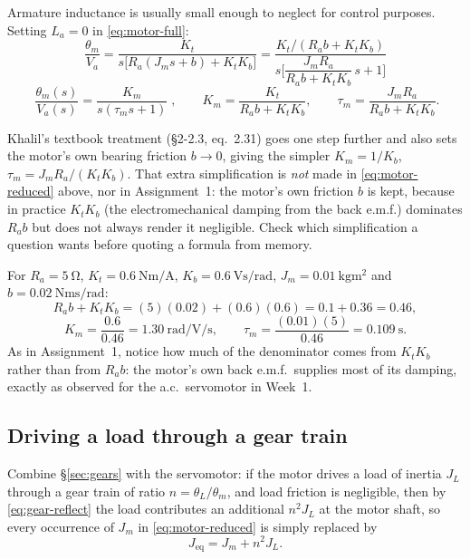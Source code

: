 \documentclass[11pt,a4paper]{article}
\begin{document}
Armature inductance is usually small enough to neglect for control purposes.
Setting $L_a=0$ in \eqref{eq:motor-full}:
\[
  \frac{\theta_m}{V_a} = \frac{K_t}{s\big[R_a(J_ms+b)+K_tK_b\big]}
  = \frac{K_t/(R_ab+K_tK_b)}
        {s\Big[\dfrac{J_mR_a}{R_ab+K_tK_b}\,s+1\Big]}
\]
\begin{equation}
  \boxed{\;\frac{\theta_m(s)}{V_a(s)}=\frac{K_m}{s(\tau_ms+1)}\;},
  \qquad
  K_m=\frac{K_t}{R_ab+K_tK_b}, \qquad
  \tau_m=\frac{J_mR_a}{R_ab+K_tK_b} .
  \label{eq:motor-reduced}
\end{equation}

\begin{pitfall}
Khalil's textbook treatment (\S2-2.3, eq.~2.31) goes one step further and also
sets the motor's own bearing friction $b\to0$, giving the simpler
$K_m=1/K_b$, $\tau_m=J_mR_a/(K_tK_b)$. That extra simplification is \emph{not}
made in \eqref{eq:motor-reduced} above, nor in Assignment~1: the motor's own
friction $b$ is kept, because in practice $K_tK_b$ (the electromechanical
damping from the back e.m.f.) dominates $R_ab$ but does not always render it
negligible. Check which simplification a question wants before quoting a
formula from memory.
\end{pitfall}

\begin{workedex}[title=Worked example 2.4 --- servomotor constants]
For $R_a=\SI{5}{\ohm}$, $K_t=\SI{0.6}{\newton\metre\per\ampere}$,
$K_b=\SI{0.6}{\volt\second\per\radian}$, $J_m=\SI{0.01}{\kilogram\metre\squared}$
and $b=\SI{0.02}{\newton\metre\second\per\radian}$:
\[
  R_ab+K_tK_b = (5)(0.02)+(0.6)(0.6) = 0.1+0.36 = 0.46,
\]
\[
  K_m=\frac{0.6}{0.46}=\SI{1.30}{\radian\per\volt\per\second}, \qquad
  \tau_m=\frac{(0.01)(5)}{0.46}=\SI{0.109}{\second} .
\]
As in Assignment~1, notice how much of the denominator comes from $K_tK_b$
rather than from $R_ab$: the motor's own back e.m.f.\ supplies most of its
damping, exactly as observed for the a.c.\ servomotor in Week~1.
\end{workedex}

\subsection{Driving a load through a gear train}
\label{sec:servo-gears}

Combine \S\ref{sec:gears} with the servomotor: if the motor drives a load of
inertia $J_L$ through a gear train of ratio $n=\theta_L/\theta_m$, and load
friction is negligible, then by \eqref{eq:gear-reflect} the load contributes an
additional $n^2J_L$ at the motor shaft, so every occurrence of $J_m$ in
\eqref{eq:motor-reduced} is simply replaced by
\begin{equation}
  J_{\text{eq}} = J_m + n^2J_L .
  \label{eq:servo-gear-Jeq}
\end{equation}
\end{document}
